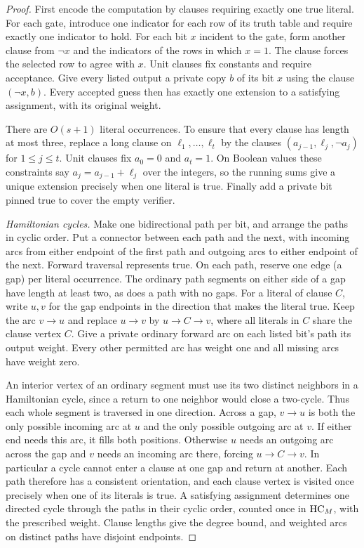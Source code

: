 \begin{proof}
First encode the computation by clauses requiring exactly one true
literal. For each gate, introduce one indicator for each row of its
truth table and require exactly one indicator to hold. For each bit $x$
incident to the gate, form another clause from $\neg x$ and the
indicators of the rows in which $x=1$. The clause forces the selected
row to agree with $x$. Unit clauses fix constants and require
acceptance. Give every listed output a private copy $b$ of its bit $x$
using the clause $(\neg x,b)$. Every accepted guess then has exactly
one extension to a satisfying assignment, with its original weight.

There are $O(s+1)$ literal occurrences. To ensure that every clause
has length at most three, replace a long clause on
$\ell_1,\ldots,\ell_t$ by the clauses $(a_{j-1},\ell_j,\neg a_j)$
for $1\le j\le t$. Unit clauses fix $a_0=0$ and $a_t=1$. On Boolean
values these constraints say $a_j=a_{j-1}+\ell_j$ over the integers,
so the running sums give a unique extension precisely when one literal
is true. Finally add a private bit pinned true to cover the empty
verifier.

\smallskip\noindent\emph{Hamiltonian cycles.}
Make one bidirectional path per bit, and arrange the paths in cyclic
order. Put a connector between each path and the next, with incoming
arcs from either endpoint of the first path and outgoing arcs to either
endpoint of the next. Forward traversal represents true. On each path,
reserve one edge (a gap) per literal occurrence. The ordinary path
segments on either side of a gap have length at least two, as does a
path with no gaps. For a literal of clause $C$, write $u,v$ for the gap
endpoints in the direction that makes the literal true. Keep the arc
$v\to u$ and replace $u\to v$ by $u\to C\to v$, where all literals
in $C$ share the clause vertex $C$. Give a private ordinary forward arc
on each listed bit's path its output weight. Every other permitted arc
has weight one and all missing arcs have weight zero.

An interior vertex of an ordinary segment must use its two distinct
neighbors in a Hamiltonian cycle, since a return to one neighbor would
close a two-cycle. Thus each whole segment is traversed in one
direction. Across a gap, $v\to u$ is both the only possible incoming
arc at $u$ and the only possible outgoing arc at $v$. If either end
needs this arc, it fills both positions. Otherwise $u$ needs an
outgoing arc across the gap and $v$ needs an incoming arc there, forcing
$u\to C\to v$. In particular a cycle cannot enter a clause at one
gap and return at another. Each path therefore has a consistent
orientation, and each clause vertex is visited once precisely when
one of its literals is true. A satisfying assignment determines one
directed cycle through the paths in their cyclic order, counted once
in $\mathrm{HC}_M$, with the prescribed weight. Clause lengths give the degree
bound, and weighted arcs on distinct paths have disjoint endpoints.


\end{proof}
